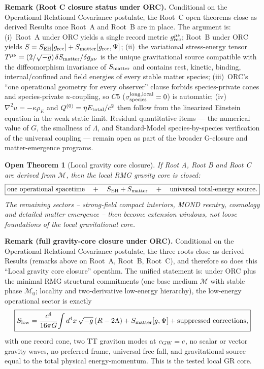 \documentclass[11pt]{article}
\newtheorem{openthm}{Open Theorem}
\begin{document}
\medskip\noindent\textbf{Remark (Root C closure status under ORC).}
Conditional on the Operational Relational Covariance postulate, the Root~C
open theorems close as derived Results once Root~A and Root~B are in place.
The argument is:
(i)~Root~A under ORC yields a single record metric $g_{\rm rec}^{\mu\nu}$;
Root~B under ORC yields $S=S_{\rm EH}[g_{\rm rec}]+S_{\rm matter}[g_{\rm rec},\Psi]$;
(ii)~the variational stress-energy tensor
$T^{\mu\nu}=(2/\sqrt{-g})\,\delta S_{\rm matter}/\delta g_{\mu\nu}$ is the
unique gravitational source compatible with the diffeomorphism invariance of
$S_{\rm matter}$ and contains rest, kinetic, binding, internal/confined and
field energies of every stable matter species;
(iii)~ORC's ``one operational geometry for every observer'' clause forbids
species-private cones and species-private $u$-coupling, so $C5$
($\sigma_{\rm species}^{\rm long,local}=0$) is automatic;
(iv)~$\nabla^2u=-\kappa\rho_E$ and $Q^{(0)}=\eta E_{\rm total}/c^2$ then
follow from the linearized Einstein equation in the weak static limit.
Residual quantitative items --- the numerical value of $G$, the smallness of
$\Lambda$, and Standard-Model species-by-species verification of the
universal coupling --- remain open as part of the broader G-closure and
matter-emergence programs.

\begin{openthm}[Local gravity core closure]
If Root A, Root B and Root C are derived from \(\mathcal M\), then the local
RMG gravity core is closed:
\[
\boxed{
\text{one operational spacetime}
\quad+\quad
S_{\rm EH}+S_{\rm matter}
\quad+\quad
\text{universal total-energy source}.
}
\]
The remaining sectors -- strong-field compact interiors, MOND reentry,
cosmology and detailed matter emergence -- then become extension windows, not
loose foundations of the local gravitational core.
\end{openthm}

\medskip\noindent\textbf{Remark (full gravity-core closure under ORC).}
Conditional on the Operational Relational Covariance postulate, the three
roots close as derived Results (remarks above on Root~A, Root~B, Root~C),
and therefore so does this ``Local gravity core closure'' openthm.  The
unified statement is: under ORC plus the minimal RMG structural
commitments (one base medium $\mathcal M$ with stable phase $\mathcal M_0$;
locality and two-derivative low-energy hierarchy), the low-energy
operational sector is exactly
\[
\boxed{
S_{\rm low}
=
\frac{c^4}{16\pi G}\!\int d^4x\,\sqrt{-g}\,(R-2\Lambda)
+
S_{\rm matter}[g,\Psi]
+
\text{suppressed corrections},
}
\]
with one record cone, two TT graviton modes at $c_{\rm GW}=c$, no scalar
or vector gravity waves, no preferred frame, universal free fall, and
gravitational source equal to the total physical energy-momentum.  This is
the tested local GR core.
\smallskip
\end{document}

